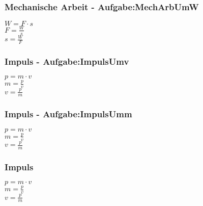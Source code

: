\subsubsection{Mechanische Arbeit - Aufgabe:MechArbUmW} 
\begin{minipage}{0.45\textwidth} 
$ W = F\cdot s $\\ 
$ F = \frac{W}{s} $\\ 
$ s = \frac{W}{F} $\\ 
\end{minipage} 
\begin{minipage}{0.45\textwidth} 
 
\end{minipage} 
\subsubsection{Impuls - Aufgabe:ImpulsUmv} 
\begin{minipage}{0.45\textwidth} 
$ p = m\cdot v $\\ 
$ m = \frac{p}{v} $\\ 
$ v = \frac{p}{m} $\\ 
\end{minipage} 
\begin{minipage}{0.45\textwidth} 
 
\end{minipage} 
\subsubsection{Impuls - Aufgabe:ImpulsUmm} 
\begin{minipage}{0.45\textwidth} 
$ p = m\cdot v $\\ 
$ m = \frac{p}{v} $\\ 
$ v = \frac{p}{m} $\\ 
\end{minipage} 
\begin{minipage}{0.45\textwidth} 
 
\end{minipage} 
\subsubsection{Impuls} 
\begin{minipage}{0.45\textwidth} 
$ p = m\cdot v $\\ 
$ m = \frac{p}{v} $\\ 
$ v = \frac{p}{m} $\\ 
\end{minipage} 
\begin{minipage}{0.45\textwidth} 
 
\end{minipage} 
